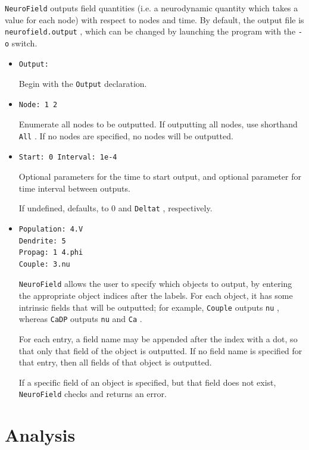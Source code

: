 \documentclass[12pt,a4paper]{article}
\newcommand{\type}[1]{ {\small\small\tt #1} }
\newcommand{\NF}[0]{ \type{NeuroField}}
\begin{document}
\NF outputs field quantities (i.e. a neurodynamic quantity which takes a value for each node) with respect to nodes and time. By default, the output file is \type{neurofield.output}, which can be changed by launching the program with the \type{-o} switch.

\begin{itemize}
	\item \begin{lstlisting}
Output:
		\end{lstlisting}
Begin with the \type{Output} declaration.
\item \begin{lstlisting}
Node: 1 2
\end{lstlisting}
Enumerate all nodes to be outputted. If outputting all nodes, use shorthand \type{All}. If no nodes are specified, no nodes will be outputted.
\item \begin{lstlisting}
Start: 0 Interval: 1e-4
\end{lstlisting}
Optional parameters for the time to start output, and optional parameter for time interval between outputs.

If undefined, defaults, to 0 and \type{Deltat}, respectively.
\item \begin{lstlisting}
Population: 4.V
Dendrite: 5
Propag: 1 4.phi
Couple: 3.nu
\end{lstlisting}

\NF allows the user to specify which objects to output, by entering the appropriate object indices after the labels. For each object, it has some intrinsic fields that will be outputted; for example, \type{Couple} outputs \type{nu}, whereas \type{CaDP} outputs \type{nu} and \type{Ca}.

For each entry, a field name may be appended after the index with a dot, so that only that field of the object is outputted. If no field name is specified for that entry, then all fields of that object is outputted.

If a specific field of an object is specified, but that field does not exist, \NF checks and returns an error.

\end{itemize}

\section{Analysis}
\label{sec:analysis}
\end{document}
